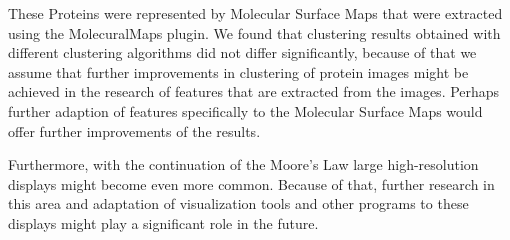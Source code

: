 \documentclass[journal]{vgtc}       %
\begin{document}
These Proteins were represented by Molecular Surface Maps that were extracted using the MolecuralMaps plugin.
We found that clustering results obtained with different clustering algorithms did not differ significantly, because of that we assume that further improvements in clustering of protein images might be achieved in the research of features that are extracted from the images. Perhaps further adaption of features specifically to the Molecular Surface Maps would offer further improvements of the results. 

Furthermore, with the continuation of the Moore's Law large high-resolution displays might become even more common. Because of that, further research in this area and adaptation of visualization tools and other programs to these displays might play a significant role in the future.




\end{document}
